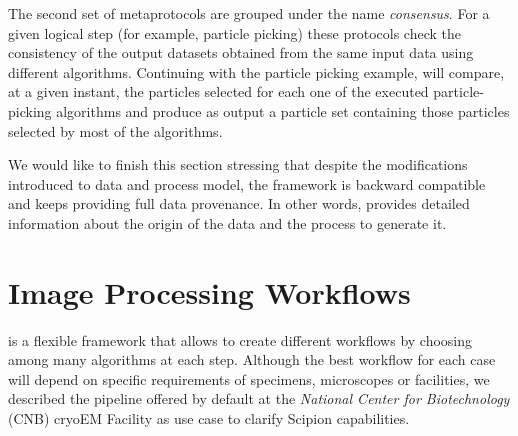 The second set of metaprotocols are grouped under the name \emph{consensus}. For a given logical step (for example, particle picking) these protocols check 
the consistency of the output datasets obtained from the same input data using different algorithms. Continuing with the particle picking example,  will compare, at a given instant, the particles selected for each one of the executed particle-picking algorithms and produce as output a particle set containing those particles selected by most of the algorithms.

We would like to finish this section stressing that despite the modifications introduced to \scipion data and process model, the framework is backward compatible and keeps providing full data provenance. In other words, \scipion provides detailed information about the origin of the data  and the process to generate it.





\section{Image Processing Workflows}

\scipion is a flexible framework that allows to create different workflows by choosing among many algorithms at each step. Although the best workflow for each case will depend on specific requirements of specimens, microscopes or facilities, we  described the pipeline offered by default at the \emph{National Center for Biotechnology} (CNB) cryoEM Facility as use case to clarify Scipion capabilities.

